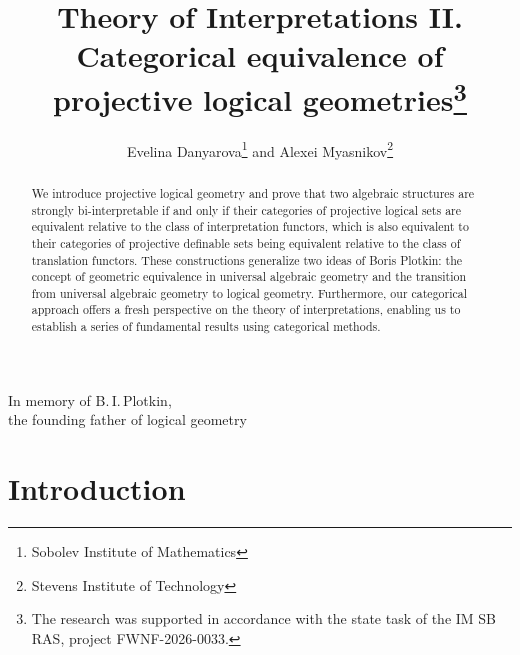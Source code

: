 \documentclass[12pt]{article}
\title{Theory of Interpretations II. Categorical equivalence of projective logical geometries\footnote{The research was supported in accordance with the state task of the IM SB RAS, project FWNF-2026-0033.}}
\date{}
\author{Evelina Danyarova\footnote{Sobolev Institute of Mathematics} and Alexei Myasnikov\footnote{Stevens Institute of Technology}}
\theoremstyle{definition}
\begin{document}
\maketitle

\begin{flushright}
{\small In memory of B.\,I.\,Plotkin, \\ the founding father of logical geometry}
\end{flushright}

\begin{abstract} 
We introduce projective logical geometry and prove that two algebraic structures are strongly bi-interpretable if and only if their categories of projective logical sets are equivalent relative to the class of interpretation functors, which is also equivalent to their categories of projective definable sets being equivalent relative to the class of translation functors. These constructions generalize two ideas of Boris Plotkin: the concept of geometric equivalence in universal algebraic geometry and the transition from universal algebraic geometry to logical geometry. Furthermore, our categorical approach offers a fresh perspective on the theory of interpretations, enabling us to establish a series of fundamental results using categorical methods.
\end{abstract}

\tableofcontents

\section{Introduction}\label{sec:intro} 
\end{document}
